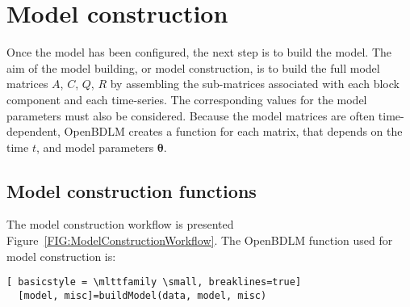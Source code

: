 \section{Model construction}
\label{S:MODELCONSTRUCTION}

Once the model has been configured, the next step is to build the model.
The aim of the model building, or model construction, is to build the full model matrices $A$, $C$, $Q$, $R$ by assembling the sub-matrices associated with each block component and each time-series.
The corresponding values for the model parameters must also be considered. 
Because the model matrices are often time-dependent, OpenBDLM creates a function for each matrix, that depends on the time $t$, and model parameters $\bm\theta$.

\subsection{Model construction functions}

The model construction workflow is presented Figure~\ref{FIG:ModelConstructionWorkflow}. The OpenBDLM function used for model construction is:

\begin{description}[style=unboxed]
\item[Builds the model ] \leavevmode
  \begin{lstlisting}[ basicstyle = \mlttfamily \small, breaklines=true]
  [model, misc]=buildModel(data, model, misc)
 \end{lstlisting}
\end{description}

